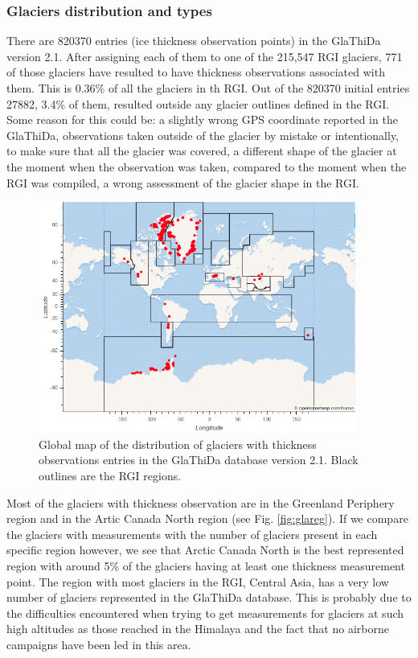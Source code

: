 \subsubsection{Glaciers distribution and types}
There are 820370 entries (ice thickness observation points) in the GlaThiDa version 2.1. After assigning each of them to one of the 215,547 RGI glaciers, 771 of those glaciers have resulted to have thickness observations associated with them. This is 0.36\% of all the glaciers in th RGI. Out of the 820370 initial entries 27882, 3.4\% of them, resulted outside any glacier outlines defined in the RGI. Some reason for this could be: a slightly wrong GPS coordinate reported in the GlaThiDa, observations taken outside of the glacier by mistake or intentionally, to make sure that all the glacier was covered, a different shape of the glacier at the moment when the observation was taken, compared to the moment when the RGI was compiled, a wrong assessment of the glacier shape in the RGI.
\begin{figure}[tp]\label{glathidamap} 
	\centering 
	\includegraphics[width=0.93\textwidth]{./figures/GlaThiDa_map.png}
	\caption{Global map of the distribution of glaciers with thickness observations entries in the GlaThiDa database version 2.1. Black outlines are the RGI regions.}
\end{figure}

Most of the glaciers with thickness observation are in the Greenland Periphery region and in the Artic Canada North region (see Fig. \ref{fig:glareg}). If we compare the glaciers with measurements with the number of glaciers present in each specific region however, we see that Arctic Canada North is the best represented region with around 5\% of the glaciers having at least one thickness measurement point. The region with most glaciers in the RGI, Central Asia, has a very low number of glaciers represented in the GlaThiDa database. This is probably due to the difficulties encountered when trying to get measurements for glaciers at such high altitudes as those reached in the Himalaya and the fact that no airborne campaigns have been led in this area.


